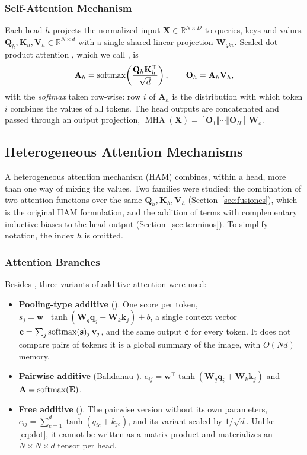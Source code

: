 \subsubsection{Self-Attention Mechanism}
Each head $h$ projects the normalized input $\mathbf{X}\in\mathbb{R}^{N\times D}$ to queries, keys and values $\mathbf{Q}_h,\mathbf{K}_h,\mathbf{V}_h\in\mathbb{R}^{N\times d}$ with a single shared linear projection $\mathbf{W}_{qkv}$. Scaled dot-product attention \citep{vaswani2017attention}, which we call , is
\begin{equation}
  \mathbf{A}_h = \operatorname{softmax}\!\left(\frac{\mathbf{Q}_h\mathbf{K}_h^\top}{\sqrt{d}}\right), \qquad
  \mathbf{O}_h = \mathbf{A}_h \mathbf{V}_h,
  \label{eq:dot}
\end{equation}
with the \emph{softmax} taken row-wise: row $i$ of $\mathbf{A}_h$ is the distribution with which token $i$ combines the values of all tokens. The head outputs are concatenated and passed through an output projection, $\operatorname{MHA}(\mathbf{X}) = [\mathbf{O}_1\Vert\cdots\Vert\mathbf{O}_H]\,\mathbf{W}_o$.

\subsection{Heterogeneous Attention Mechanisms}
\label{sec:ham}
A heterogeneous attention mechanism (HAM) combines, within a head, more than one way of mixing the values. Two families were studied: the combination of two attention functions over the same $\mathbf{Q}_h,\mathbf{K}_h,\mathbf{V}_h$ (Section~\ref{sec:fusiones}), which is the original HAM formulation, and the addition of terms with complementary inductive biases to the head output (Section~\ref{sec:terminos}). To simplify notation, the index $h$ is omitted.

\subsubsection{Attention Branches}
Besides , three variants of additive attention were used:
\begin{itemize}
  \item \textbf{Pooling-type additive} (). One score per token, $s_j = \mathbf{w}^\top\tanh(\mathbf{W}_q\mathbf{q}_j + \mathbf{W}_k\mathbf{k}_j) + b$, a single context vector $\mathbf{c} = \sum_j \operatorname{softmax}(\mathbf{s})_j\,\mathbf{v}_j$, and the same output $\mathbf{c}$ for every token. It does not compare pairs of tokens: it is a global summary of the image, with $O(Nd)$ memory.
  \item \textbf{Pairwise additive} (Bahdanau \citep{bahdanau2015neural}). $e_{ij} = \mathbf{w}^\top\tanh(\mathbf{W}_q\mathbf{q}_i + \mathbf{W}_k\mathbf{k}_j)$ and $\mathbf{A}=\operatorname{softmax}(\mathbf{E})$.
  \item \textbf{Free additive} (). The pairwise version without its own parameters, $e_{ij} = \sum_{c=1}^{d}\tanh(q_{ic} + k_{jc})$, and its variant scaled by $1/\sqrt{d}$. Unlike \eqref{eq:dot}, it cannot be written as a matrix product and materializes an $N\times N\times d$ tensor per head.
\end{itemize}

